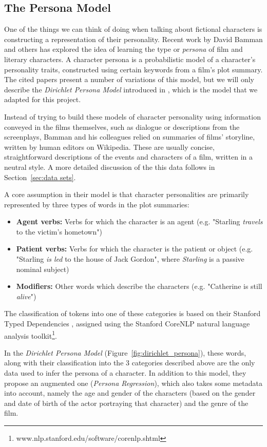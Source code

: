 \documentclass[bsc,frontabs,deptreport,singlespacing,parskip, twoside]{infthesis}
\begin{document}
\subsection{The Persona Model}
\label{sec:bg_persona}
One of the things we can think of doing when talking about fictional characters is constructing a representation of their personality. Recent work by David Bamman and others has explored the idea of learning the type or \textit{persona} of film \cite{Bamman2013} and literary \cite{Bamman2014} characters. A character persona is a probabilistic model of a character's personality traits, constructed using certain keywords from a film's plot summary. The cited papers present a number of variations of this model, but we will only describe the \textit{Dirichlet Persona Model} introduced in \cite{Bamman2013}, which is the model that we adapted for this project.

Instead of trying to build these models of character personality using information conveyed in the films themselves, such as dialogue or descriptions from the screenplays, Bamman and his colleagues relied on summaries of films' storyline, written by human editors on Wikipedia. These are usually concise, straightforward descriptions of the events and characters of a film, written in a neutral style. A more detailed discussion of the this data follows in Section~\ref{sec:data sets}. 

A core assumption in their model is that character personalities are primarily represented by three types of words in the plot summaries:
\begin{itemize}
	\item \textbf{Agent verbs:} Verbs for which the character is an agent (e.g. "Starling \textit{travels} to the victim's hometown")
	\item \textbf{Patient verbs:} Verbs for which the character is the patient or object (e.g. "Starling \textit{is led} to the house of Jack Gordon", where \textit{Starling} is a passive nominal subject)
	\item \textbf{Modifiers:} Other words which describe the characters (e.g. "Catherine is still \textit{alive}")
\end{itemize}

The classification of tokens into one of these categories is based on their Stanford Typed Dependencies \cite{de2008stanford}, assigned using the Stanford CoreNLP natural language analysis toolkit\footnote{www.nlp.stanford.edu/software/corenlp.shtml}.

In the \textit{Dirichlet Persona Model} (Figure~\ref{fig:dirichlet_persona}), these words, along with their classification into the 3 categories described above are the only data used to infer the persona of a character. In addition to this model, they propose an augmented one (\textit{Persona Regression}), which also takes some metadata into account, namely the age and gender of the characters (based on the gender and date of birth of the actor portraying that character) and the genre of the film.
\end{document}
